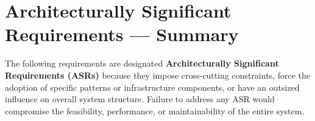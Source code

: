\documentclass[12pt, a4paper]{article}
\begin{document}
\section{Architecturally Significant Requirements --- Summary}

The following requirements are designated \textbf{Architecturally Significant Requirements (ASRs)} because they impose cross-cutting constraints, force the adoption of specific patterns or infrastructure components, or have an outsized influence on overall system structure. Failure to address any ASR would compromise the feasibility, performance, or maintainability of the entire system.

\vspace{0.6em}
\end{document}
